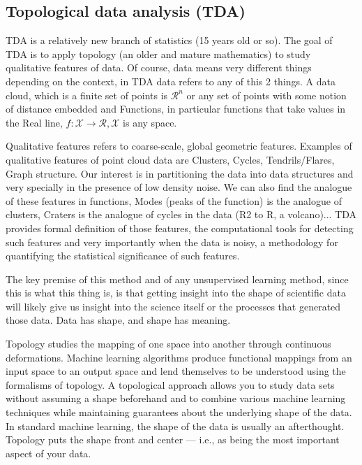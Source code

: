 \documentclass[onecollarge,runningheads]{svjour2}
\begin{document}
\subsection{Topological data analysis (TDA)}
\label{sec:tda}

TDA is a relatively new branch of statistics (15 years old or so). The  goal of TDA is to apply topology (an older and mature mathematics) to study qualitative features of data. 
Of course, data means very different things depending on the context, in TDA data refers to any of this 2 things. A data cloud, which is  a finite set of points is $\mathcal{R}^n$  or any set of points with some notion of distance embedded and Functions, in particular functions that take values in the Real line, $f:\mathcal{X} \to \mathcal{R}, \mathcal{X}$ is any space.

Qualitative features refers to coarse-scale, global geometric features. Examples of qualitative features of point cloud data are Clusters, Cycles, Tendrils/Flares, Graph structure.  Our interest is in partitioning the data into data structures and very specially in the presence of low density noise. We can also find the analogue of these features in functions, Modes (peaks of the function) is the analogue of clusters, Craters is the analogue of cycles in the data (R2 to R, a volcano)...
TDA provides formal definition of those features, the computational tools for detecting such features and very importantly when the data is noisy, a methodology for quantifying the statistical significance of such features.

The key premise of this method and of any unsupervised learning method, since this is what this thing is, is that getting insight into the shape of scientific data will likely give us insight into the science itself or the processes that generated those data.
Data has shape, and shape has meaning.


Topology studies the mapping of one space into another through continuous deformations.
Machine learning algorithms produce functional mappings from an input space to an output space and lend themselves to be understood using the formalisms of topology. A topological approach allows you to study data sets without assuming a shape beforehand and to combine various machine learning techniques while maintaining guarantees about the underlying shape of the data.  In standard machine learning, the shape of the data is usually an afterthought. Topology puts the shape front and center — i.e., as being the most important aspect of your data.
\end{document}
